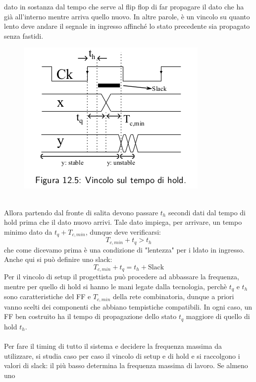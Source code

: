 \documentclass{book}
\begin{document}
        dato in sostanza dal tempo che serve al flip flop di far propagare il dato che ha già all'interno mentre arriva quello nuovo. In altre 
        parole, è un vincolo su quanto lento deve andare il segnale in ingresso affinché lo stato precedente sia propagato senza fastidi.
        \begin{figure}[h!]
            \center   
            \includegraphics[width=0.5\linewidth]{img/chapt12img4.png}
        \end{figure} \\
        Allora partendo dal fronte di salita devono passare $t_{h}$ secondi dati dal tempo di hold prima che il 
        dato nuovo arrivi. Tale dato impiega, per arrivare, un tempo minimo dato da $t_{q}+T_{c,min}$, dunque deve verificarsi:
        \begin{equation}
            T_{c,min}+t_{q}>t_{h}
        \end{equation}
        che come dicevamo prima è una condizione di "lentezza" per i ldato in ingresso.
        Anche qui si può definire uno slack:
        \begin{equation}
            T_{c,min}+t_{q}=t_{h}+\textrm{Slack}
        \end{equation}
        Per il vincolo di setup il progettista può procedere ad abbassare la frequenza, mentre per quello di hold si hanno 
        le mani legate dalla tecnologia, perchè $t_{q}$ e $t_{h}$ sono caratteristiche del FF e $T_{c,min}$ della rete combinatoria, dunque 
        a priori vanno scelti dei componenti che abbiano tempistiche compatibili. In ogni caso, un FF ben costruito ha il tempo di 
        propagazione dello stato $t_{q}$ maggiore di quello di hold $t_{h}$. \\ \\
        Per fare il timing di tutto il sistema e decidere la frequenza massima da utilizzare, si studia caso per caso 
        il vincolo di setup e di hold e si raccolgono i valori di slack: il più basso determina la frequenza massima di lavoro. Se almeno uno 
\end{document}
